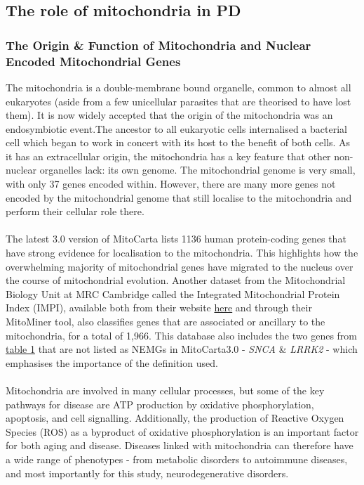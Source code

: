 \documentclass{article}
\begin{document}
\subsection{The role of mitochondria in PD}
\label{subsec:mitochondria}
\subsubsection{The Origin \& Function of Mitochondria and Nuclear Encoded Mitochondrial Genes}
The mitochondria is a double-membrane bound organelle, common to almost all eukaryotes (aside from a few unicellular parasites that are theorised to have lost them\cite{Karnkowska2016AOrganelle}). It is now widely accepted that the origin of the mitochondria was an endosymbiotic event\cite{Martin2015EndosymbioticOrigin.}.The ancestor to all eukaryotic cells internalised a bacterial cell which began to work in concert with its host to the benefit of both cells. As it has an extracellular origin, the mitochondria has a key feature that other non-nuclear organelles lack: its own genome. The mitochondrial genome is very small, with only 37 genes encoded within\cite{Taanman1999TheReplication}. However, there are many more genes not encoded by the mitochondrial genome that still localise to the mitochondria and perform their cellular role there.
\\
\\The latest 3.0 version of MitoCarta \cite{Rath2021MitoCarta3.0:Annotations} lists 1136 human protein-coding genes that have strong evidence for localisation to the mitochondria. This highlights how the overwhelming majority of mitochondrial genes have migrated to the nucleus over the course of mitochondrial evolution. Another dataset from the Mitochondrial Biology Unit at MRC Cambridge called the Integrated Mitochondrial Protein Index (IMPI), available both from their website \href{https://www.mrc-mbu.cam.ac.uk/research-resources-and-facilities/impi}{here} and through their MitoMiner tool\cite{Smith2016MitoMinerDatabase}, also classifies genes that are associated or ancillary to the mitochondria, for a total of 1,966. This database also includes the two genes from \hyperref[tab:first]{table 1} that are not listed as NEMGs in MitoCarta3.0 - \textit{SNCA} \& \textit{LRRK2} - which emphasises the importance of the definition used.
\\
\\Mitochondria are involved in many cellular processes, but some of the key pathways for disease are ATP production by oxidative phosphorylation, apoptosis, and cell signalling\cite{Rossmann2021MitochondrialDisease}. Additionally, the production of Reactive Oxygen Species (ROS) as a byproduct of oxidative phosphorylation is an important factor for both aging and disease\cite{Brieger2012ReactiveDisease}. Diseases linked with mitochondria can therefore have a wide range of phenotypes - from metabolic disorders\cite{Bhatti2017MitochondrialStrategies} to autoimmune diseases\cite{Xu2020EmergingDiseases}, and most importantly for this study, neurodegenerative disorders\cite{MonzioCompagnoni2020TheDisease}.
\end{document}
